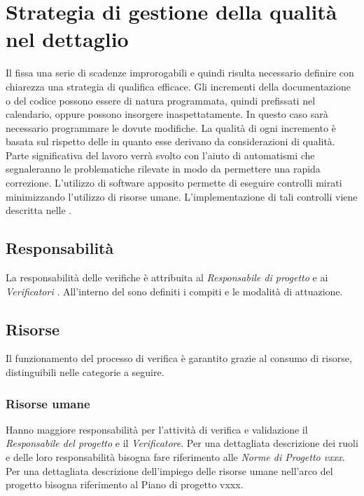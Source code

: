 \section[Visione di dettaglio della qualità]{Strategia di gestione
  della qualità nel dettaglio}

Il \pianodiprogetto  fissa una serie di scadenze improrogabili e quindi risulta necessario definire
con chiarezza una strategia di qualifica efficace. Gli incrementi della documentazione o del codice
possono essere di natura programmata, quindi prefissati nel calendario, oppure possono insorgere
inaspettatamente. In questo caso sarà necessario programmare le dovute
modifiche.
La qualità di ogni incremento è basata sul rispetto delle \normediprogetto in quanto esse derivano da considerazioni di qualità.
Parte significativa del lavoro
verrà svolto con l'aiuto di automatismi che segnaleranno le problematiche rilevate in modo da
permettere una rapida correzione. L’utilizzo di software apposito permette di eseguire controlli
mirati minimizzando l'utilizzo di risorse umane. L'implementazione di tali controlli viene descritta nelle
\normediprogetto .



\subsection{Responsabilità}

La responsabilità delle verifiche è attribuita al  \emph{Responsabile di
  progetto} e ai  \emph{Verificatori} . All'interno del \pianodiprogetto  sono definiti i compiti e le modalità di
attuazione.

\subsection{Risorse}
Il funzionamento del processo di verifica è garantito grazie al consumo di risorse, distinguibili
nelle categorie a seguire.
\subsubsection{Risorse umane}

Hanno maggiore responsabilità per l'attività di verifica
e validazione il \emph{Responsabile del progetto} e il
\emph{Verificatore}. Per una dettagliata descrizione dei ruoli e delle
loro responsabilità bisogna fare riferimento alle \emph{Norme di
  Progetto vxxx}. Per una dettagliata descrizione dell'impiego delle
risorse umane nell'arco del progetto bisogna riferimento al Piano di
progetto vxxx.

